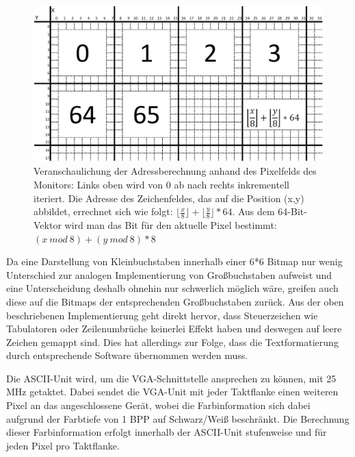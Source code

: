 \begin{figure}[H]
	\centering
		\includegraphics[width=1.0\textwidth]{Bildschirm.png}
	\caption[Veranschaulichung der Adressberechnung der ASCII-Unit]{Veranschaulichung der Adressberechnung anhand des Pixelfelds des Monitors: Links oben wird von 0 ab nach rechts inkrementell iteriert. Die Adresse des Zeichenfeldes, das auf die Position (x,y) abbildet, errechnet sich wie folgt: $\lfloor \frac{x}{8} \rfloor + \lfloor \frac{y}{8} \rfloor * 64$. Aus dem 64-Bit-Vektor wird man das Bit f\"ur den aktuelle Pixel bestimmt: $(x\:  mod\:  8) + (y\:  mod\:  8) * 8$}
\end{figure}

Da eine Darstellung von Kleinbuchstaben innerhalb einer 6*6 Bitmap nur wenig Unterschied zur analogen Implementierung von Gro\ss{}buchstaben aufweist und eine Unterscheidung deshalb ohnehin nur schwerlich m\"oglich w\"are, greifen auch diese auf die Bitmaps der entsprechenden Gro\ss{}buchstaben zur\"uck. Aus der oben beschriebenen Implementierung geht direkt hervor, dass Steuerzeichen wie Tabulatoren oder Zeilenumbr\"uche keinerlei Effekt haben und deswegen auf leere Zeichen gemappt sind. Dies hat allerdings zur Folge, dass die Textformatierung durch entsprechende Software \"ubernommen werden muss.

Die ASCII-Unit wird, um die VGA-Schnittstelle ansprechen zu k\"onnen, mit 25 MHz getaktet. Dabei sendet die VGA-Unit mit jeder Taktflanke einen weiteren Pixel an das angeschlossene Ger\"at, wobei die Farbinformation sich dabei aufgrund der Farbtiefe von 1 BPP auf Schwarz/Wei\ss{} beschr\"ankt. Die Berechnung dieser Farbinformation erfolgt innerhalb der ASCII-Unit stufenweise und f\"ur jeden Pixel pro Taktflanke. 

